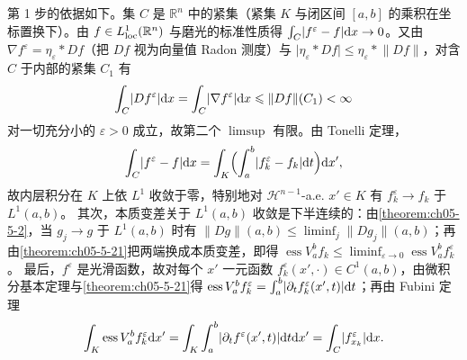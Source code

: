 \documentclass[../../main.tex]{subfiles}%
\begin{document}
第 1 步的依据如下。集 $C$ 是 $\mathbb{R}^n$ 中的紧集（紧集 $K$ 与闭区间 $[a,b]$ 的乘积在坐标置换下）。由 $f\in L^1_{\mathrm{loc}}(\mathbb{R}^n)$ 与磨光的标准性质得 $\int_C\lvert f^\varepsilon-f\rvert\mathrm{d} x\to0$。又由 $\nabla f^\varepsilon=\eta_\varepsilon*Df$（把 $Df$ 视为向量值 Radon 测度）与 $\lvert\eta_\varepsilon*Df\rvert\leqslant\eta_\varepsilon*\lVert Df\rVert$，对含 $C$ 于内部的紧集 $C_1$ 有
\begin{align*}
\int_C\lvert Df^\varepsilon\rvert\mathrm{d} x=\int_C\lvert\nabla f^\varepsilon\rvert\mathrm{d} x\leqslant\lVert Df\rVert(C_1)<\infty
\end{align*}
对一切充分小的 $\varepsilon>0$ 成立，故第二个 $\limsup$ 有限。由 Tonelli 定理，
\begin{align*}
\int_C\lvert f^\varepsilon-f\rvert\mathrm{d} x=\int_K\Bigl(\int_a^b\lvert f_k^\varepsilon-f_k\rvert\mathrm{d} t\Bigr)\mathrm{d} x',
\end{align*}
故内层积分在 $K$ 上依 $L^1$ 收敛于零，特别地对 $\mathcal{H}^{n-1}$-a.e. $x'\in K$ 有 $f_k^\varepsilon\to f_k$ 于 $L^1(a,b)$。
其次，本质变差关于 $L^1(a,b)$ 收敛是下半连续的：由\cref{theorem:ch05-5-2}，当 $g_j\to g$ 于 $L^1(a,b)$ 时有 $\lVert Dg\rVert(a,b)\leqslant\liminf_j\lVert Dg_j\rVert(a,b)$；再由\cref{theorem:ch05-5-21}把两端换成本质变差，即得 $\operatorname{ess}V_a^b f_k\leqslant\liminf_{\varepsilon\to0}\operatorname{ess}V_a^b f_k^\varepsilon$。%
最后，$f^\varepsilon$ 是光滑函数，故对每个 $x'$ 一元函数 $f_k^\varepsilon(x',\cdot)\in C^1(a,b)$，由微积分基本定理与\cref{theorem:ch05-5-21}得 $\operatorname{ess}V_a^b f_k^\varepsilon=\int_a^b\lvert\partial_t f_k^\varepsilon(x',t)\rvert\mathrm{d} t$；再由 Fubini 定理%
\begin{align*}
\int_K\operatorname{ess}V_a^b f_k^\varepsilon\mathrm{d} x'=\int_K\int_a^b\lvert\partial_t f^\varepsilon(x',t)\rvert\mathrm{d} t\mathrm{d} x'=\int_C\lvert f_{x_k}^\varepsilon\rvert\mathrm{d} x .
\end{align*}
\end{document}
